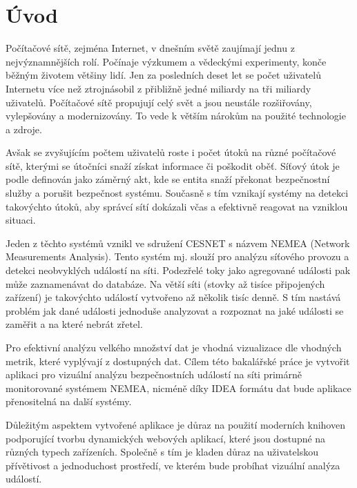 
\newcommand\note[1]{{\Large \textcolor{red}{#1}}}

\chapter{Úvod}
Počítačové sítě, zejména Internet, v dnešním světě zaujímají jednu z nejvýznamnějších rolí. Počínaje výzkumem a vědeckými experimenty, konče běžným životem většiny lidí. Jen za posledních deset let se počet uživatelů Internetu více než ztrojnásobil z přibližně jedné miliardy na tři miliardy uživatelů. Počítačové sítě propujují celý svět a jsou neustále rozšiřovány, vylepšovány a modernizovány. To vede k větším nárokům na použité technologie a zdroje. 

Avšak se zvyšujícím počtem uživatelů roste i počet útoků na různé počítačové sítě, kterými se útočníci snaží získat informace či poškodit oběť. Síťový útok je podle \cite{rfc:attack} definován jako záměrný akt, kde se entita snaží překonat bezpečnostní služby a porušit bezpečnost systému. Současně s tím vznikají systémy na detekci takovýchto útoků, aby správcí sítí dokázali včas a efektivně reagovat na vzniklou situaci.

Jeden z těchto systémů vznikl ve sdružení CESNET s názvem NEMEA (Network Measurements Analysis). Tento systém mj. slouží pro analýzu síťového provozu a detekci neobvyklých událostí na síti. Podezřelé toky jako agregované události pak může zaznamenávat  do databáze. Na větší síti (stovky až tisíce připojených zařízení) je takovýchto událostí vytvořeno až několik tisíc denně. S tím nastává problém jak dané události jednoduše analyzovat a rozpoznat na jaké události se zaměřit a na které nebrát zřetel.

Pro efektivní analýzu velkého množství dat je vhodná vizualizace dle vhodných metrik, které vyplývají z dostupných dat. Cílem této bakalářské práce je vytvořit aplikaci pro vizuální analýzu bezpečnostních událostí na síti primárně monitorované systémem NEMEA, nicméně díky IDEA formátu dat bude aplikace přenositelná na další systémy. 

Důležitým aspektem vytvořené aplikace je důraz na použití moderních knihoven podporující tvorbu dynamických webových aplikací, které jsou dostupné na různých typech zařízeních. Společně s tím je kladen důraz na uživatelskou přívětivost a jednoduchost prostředí, ve kterém bude probíhat vizuální analýza událostí.

